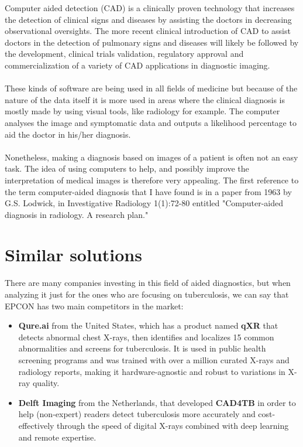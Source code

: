Computer aided detection (CAD) is a clinically proven technology that increases the detection of clinical signs and diseases by assisting the doctors in decreasing observational oversights. The more recent clinical introduction of CAD to assist doctors in the detection of pulmonary signs and diseases will likely be followed by the development, clinical trials validation, regulatory approval and commercialization of a variety of CAD applications in diagnostic imaging. \cite{Castellino2005}
\\ \\
These kinds of software are being used in all fields of medicine but because of the nature of the data itself it is more used in areas where the clinical diagnosis is mostly made by using visual tools, like radiology for example. The computer analyses the image and symptomatic data and outputs a likelihood percentage to aid the doctor in his/her diagnosis.
\\ \\
Nonetheless, making a diagnosis based on images of a patient is often not an easy task. The idea of using computers to help, and possibly improve the interpretation of medical images is therefore very appealing. The first reference to the term computer-aided diagnosis that I have found is in a paper from 1963 by G.S. Lodwick, in Investigative Radiology 1(1):72-80 entitled "Computer-aided diagnosis in radiology. A research plan." \cite{Lodwick1966}

\section{Similar solutions}

There are many companies investing in this field of aided diagnostics, but when analyzing it just for the ones who are focusing on tuberculosis, we can say that EPCON has two main competitors in the market:

\begin{itemize}

\item
\textbf{Qure.ai} from the United States, which has a product named \textbf{qXR} that detects abnormal chest X-rays, then identifies and localizes 15 common abnormalities and screens for tuberculosis. It is used in public health screening programs and was trained with over a million curated X-rays and radiology reports, making it hardware-agnostic and robust to variations in X-ray quality. \cite{QureAI}

\item 
\textbf{Delft Imaging} from the Netherlands, that developed \textbf{CAD4TB} in order to help (non-expert) readers detect tuberculosis more accurately and cost-effectively through the speed of digital X-rays combined with deep learning and remote expertise. \cite{DelftImaging}
	
\end{itemize}

